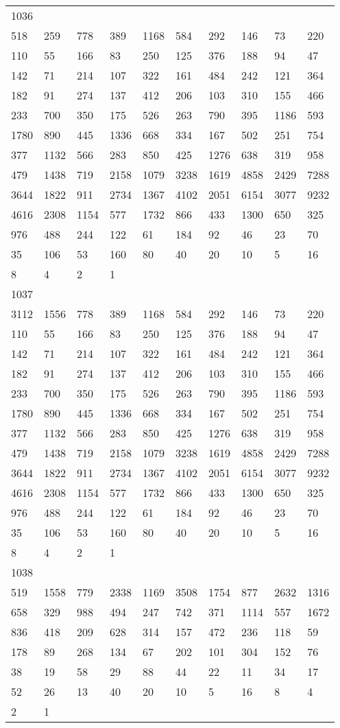 \begin{longtable}{*{10}{l}}
1036&&&&&&&&&\\
518& 259& 778& 389& 1168& 584& 292& 146& 73& 220\\
110& 55& 166& 83& 250& 125& 376& 188& 94& 47\\
142& 71& 214& 107& 322& 161& 484& 242& 121& 364\\
182& 91& 274& 137& 412& 206& 103& 310& 155& 466\\
233& 700& 350& 175& 526& 263& 790& 395& 1186& 593\\
1780& 890& 445& 1336& 668& 334& 167& 502& 251& 754\\
377& 1132& 566& 283& 850& 425& 1276& 638& 319& 958\\
479& 1438& 719& 2158& 1079& 3238& 1619& 4858& 2429& 7288\\
3644& 1822& 911& 2734& 1367& 4102& 2051& 6154& 3077& 9232\\
4616& 2308& 1154& 577& 1732& 866& 433& 1300& 650& 325\\
976& 488& 244& 122& 61& 184& 92& 46& 23& 70\\
35& 106& 53& 160& 80& 40& 20& 10& 5& 16\\
8& 4& 2& 1& \\

1037&&&&&&&&&\\
3112& 1556& 778& 389& 1168& 584& 292& 146& 73& 220\\
110& 55& 166& 83& 250& 125& 376& 188& 94& 47\\
142& 71& 214& 107& 322& 161& 484& 242& 121& 364\\
182& 91& 274& 137& 412& 206& 103& 310& 155& 466\\
233& 700& 350& 175& 526& 263& 790& 395& 1186& 593\\
1780& 890& 445& 1336& 668& 334& 167& 502& 251& 754\\
377& 1132& 566& 283& 850& 425& 1276& 638& 319& 958\\
479& 1438& 719& 2158& 1079& 3238& 1619& 4858& 2429& 7288\\
3644& 1822& 911& 2734& 1367& 4102& 2051& 6154& 3077& 9232\\
4616& 2308& 1154& 577& 1732& 866& 433& 1300& 650& 325\\
976& 488& 244& 122& 61& 184& 92& 46& 23& 70\\
35& 106& 53& 160& 80& 40& 20& 10& 5& 16\\
8& 4& 2& 1& \\

1038&&&&&&&&&\\
519& 1558& 779& 2338& 1169& 3508& 1754& 877& 2632& 1316\\
658& 329& 988& 494& 247& 742& 371& 1114& 557& 1672\\
836& 418& 209& 628& 314& 157& 472& 236& 118& 59\\
178& 89& 268& 134& 67& 202& 101& 304& 152& 76\\
38& 19& 58& 29& 88& 44& 22& 11& 34& 17\\
52& 26& 13& 40& 20& 10& 5& 16& 8& 4\\
2& 1& \\


\end{longtable}
